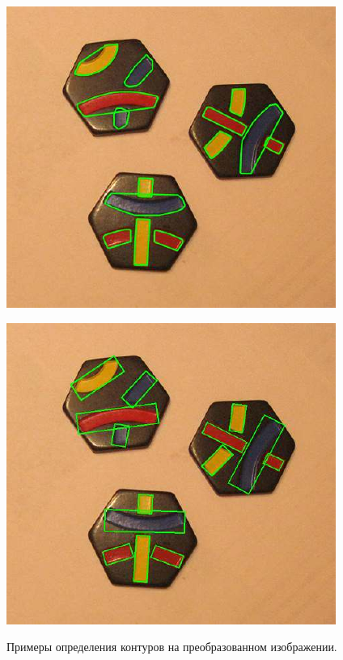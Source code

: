 \documentclass[10pt]{article}
\begin{document}
\begin{figure}[h]
\begin{minipage}[h]{0.22\linewidth}
\begin{center}
			\end{center}
		\end{minipage}
		\hfill
		\begin{minipage}[h]{0.22\linewidth}
			\begin{center}
				{\includegraphics[width=1.0\linewidth]{data/cont_col_example.pdf}}
			\end{center}
		\end{minipage}
		\hfill
		\begin{minipage}[h]{0.22\linewidth}
			\begin{center}
				{\includegraphics[width=1.0\linewidth]{data/rect_example.pdf}}
			\end{center}
		\end{minipage}
		
		\caption{Примеры определения контуров на преобразованном изображении.}
		\label{ris:image4}
	\end{figure}
	
\end{document}
